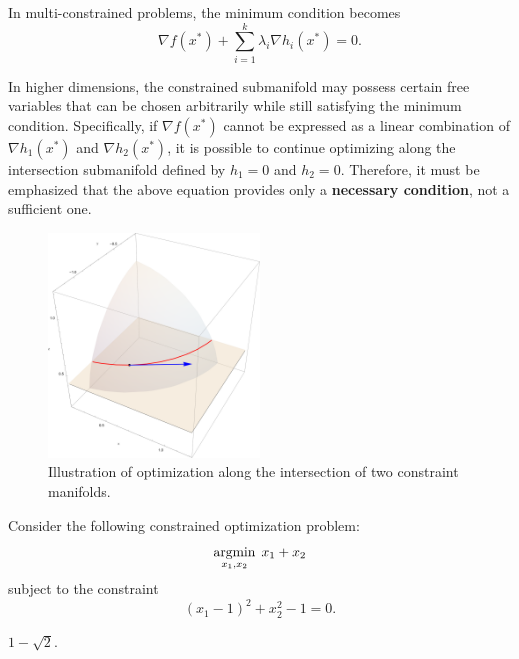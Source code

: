 \documentclass[../main]{subfiles}
\begin{document}
\begin{corollary}
    In multi-constrained problems, the minimum condition becomes
    \begin{equation}
        \nabla f(x^*) + \sum_{i=1}^k \lambda_i \nabla h_i(x^*) = 0.
    \end{equation}
\end{corollary}
\begin{remark}
    In higher dimensions, the constrained submanifold may possess certain free variables that can be chosen arbitrarily while still satisfying the minimum condition. 
    Specifically, if $\nabla f(x^*)$ cannot be expressed as a linear combination of $\nabla h_1(x^*)$ and $\nabla h_2(x^*)$, it is possible to continue optimizing along the intersection submanifold defined by $h_1=0$ and $h_2=0$.  
    Therefore, it must be emphasized that the above equation provides only a \textbf{necessary condition}, not a sufficient one.
\end{remark}

\begin{figure}[H]
    \centering
    \includegraphics[width=0.5\textwidth]{../../fig/fig2.pdf}
    \caption{Illustration of optimization along the intersection of two constraint manifolds.}
    \label{2-lr}
\end{figure}

\begin{example}
    Consider the following constrained optimization problem:
    \begin{equation}
        \mathop{\mathrm{argmin}}_{x_1, x_2} \; x_1 + x_2
    \end{equation}
    subject to the constraint
    \begin{equation}
        (x_1 - 1)^2 + x_2^2 - 1 = 0.
    \end{equation}
\end{example}
\begin{solution}
    $1-\sqrt{2}$.
\end{solution}
\end{document}
